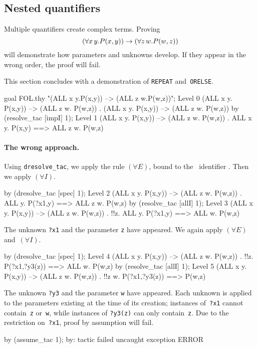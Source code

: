 \subsection{Nested quantifiers}
Multiple quantifiers create complex terms.  Proving 
\[ (\forall x\,y.P(x,y)) \rightarrow (\forall z\,w.P(w,z)) \] 
will demonstrate how parameters and unknowns develop.  If they appear in
the wrong order, the proof will fail.

This section concludes with a demonstration of {\tt REPEAT}
and~{\tt ORELSE}.  
\begin{ttbox}
goal FOL.thy "(ALL x y.P(x,y))  -->  (ALL z w.P(w,z))";
{\out Level 0}
{\out (ALL x y. P(x,y)) --> (ALL z w. P(w,z))}
{. (ALL x y. P(x,y)) --> (ALL z w. P(w,z))}
\ttbreak
by (resolve_tac [impI] 1);
{\out Level 1}
{\out (ALL x y. P(x,y)) --> (ALL z w. P(w,z))}
{. ALL x y. P(x,y) ==> ALL z w. P(w,z)}
\end{ttbox}

\paragraph{The wrong approach.}
Using {\tt dresolve_tac}, we apply the rule $(\forall E)$, bound to the
\ML\ identifier .  Then we apply $(\forall I)$.
\begin{ttbox}
by (dresolve_tac [spec] 1);
{\out Level 2}
{\out (ALL x y. P(x,y)) --> (ALL z w. P(w,z))}
{. ALL y. P(?x1,y) ==> ALL z w. P(w,z)}
\ttbreak
by (resolve_tac [allI] 1);
{\out Level 3}
{\out (ALL x y. P(x,y)) --> (ALL z w. P(w,z))}
{. !!z. ALL y. P(?x1,y) ==> ALL w. P(w,z)}
\end{ttbox}
The unknown {\tt ?x1} and the parameter {\tt z} have appeared.  We again
apply $(\forall E)$ and~$(\forall I)$.
\begin{ttbox}
by (dresolve_tac [spec] 1);
{\out Level 4}
{\out (ALL x y. P(x,y)) --> (ALL z w. P(w,z))}
{. !!z. P(?x1,?y3(z)) ==> ALL w. P(w,z)}
\ttbreak
by (resolve_tac [allI] 1);
{\out Level 5}
{\out (ALL x y. P(x,y)) --> (ALL z w. P(w,z))}
{. !!z w. P(?x1,?y3(z)) ==> P(w,z)}
\end{ttbox}
The unknown {\tt ?y3} and the parameter {\tt w} have appeared.  Each
unknown is applied to the parameters existing at the time of its creation;
instances of~{\tt ?x1} cannot contain~{\tt z} or~{\tt w}, while instances
of {\tt?y3(z)} can only contain~{\tt z}.  Due to the restriction on~{\tt ?x1},
proof by assumption will fail.
\begin{ttbox}
by (assume_tac 1);
{\out by: tactic failed}
{\out uncaught exception ERROR}
\end{ttbox}

